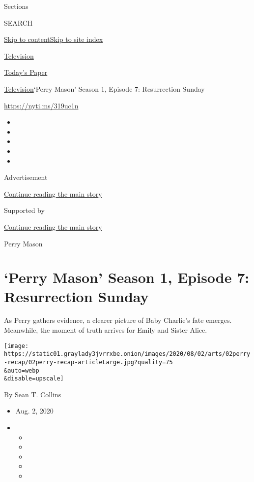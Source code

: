 Sections

SEARCH

\protect\hyperlink{site-content}{Skip to
content}\protect\hyperlink{site-index}{Skip to site index}

\href{https://www.nytimes3xbfgragh.onion/section/arts/television}{Television}

\href{https://myaccount.nytimes3xbfgragh.onion/auth/login?response_type=cookie\&client_id=vi}{}

\href{https://www.nytimes3xbfgragh.onion/section/todayspaper}{Today's
Paper}

\href{/section/arts/television}{Television}\textbar{}`Perry Mason'
Season 1, Episode 7: Resurrection Sunday

\url{https://nyti.ms/319uc1n}

\begin{itemize}
\item
\item
\item
\item
\item
\end{itemize}

Advertisement

\protect\hyperlink{after-top}{Continue reading the main story}

Supported by

\protect\hyperlink{after-sponsor}{Continue reading the main story}

Perry Mason

\hypertarget{perry-mason-season-1-episode-7-resurrection-sunday}{%
\section{`Perry Mason' Season 1, Episode 7: Resurrection
Sunday}\label{perry-mason-season-1-episode-7-resurrection-sunday}}

As Perry gathers evidence, a clearer picture of Baby Charlie's fate
emerges. Meanwhile, the moment of truth arrives for Emily and Sister
Alice.

\texttt{[image: https://static01.graylady3jvrrxbe.onion/images/2020/08/02/arts/02perry-recap/02perry-recap-articleLarge.jpg?quality=75\\\&auto=webp\\\&disable=upscale]}

By Sean T. Collins

\begin{itemize}
\item
  Aug. 2, 2020
\item
  \begin{itemize}
  \item
  \item
  \item
  \item
  \item
  \end{itemize}
\end{itemize}

